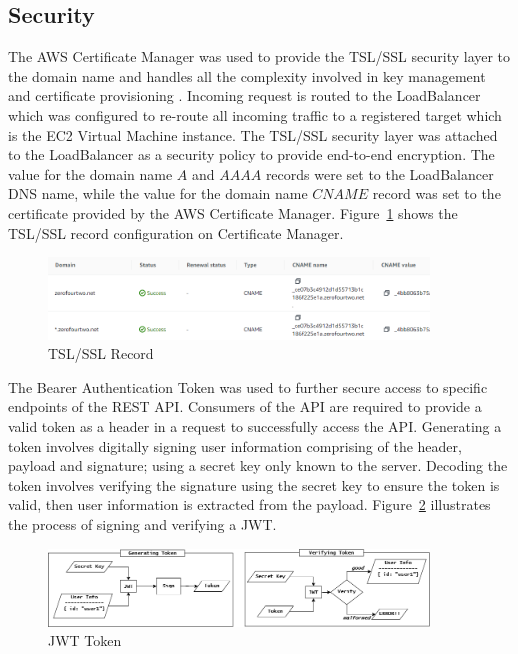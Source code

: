 \subsection{Security}
The AWS Certificate Manager was used to provide the TSL/SSL security layer to the domain name and handles all the complexity involved in 
key management and certificate provisioning \cite{aws_acm}. Incoming request is routed to the LoadBalancer which was configured to re-route all incoming traffic 
to a registered target which is the EC2 Virtual Machine instance. The TSL/SSL security layer was attached to the LoadBalancer as a security policy 
to provide end-to-end encryption. The value for the domain name $A$ and $AAAA$ records were set to the LoadBalancer DNS name, while the value 
for the domain name $CNAME$ record was set to the certificate provided by the AWS Certificate Manager. 
Figure~\ref{image:ssl_record} shows the TSL/SSL record configuration on Certificate Manager. 

\begin{figure}[h!]
    \begin{center}
        \includegraphics[width=0.9\textwidth]{images/ssl_record.png}
        \caption{TSL/SSL Record}
        \label{image:ssl_record}
    \end{center}
\end{figure}

The Bearer Authentication Token was used to further secure access to specific endpoints of the REST API. Consumers of the API are required to 
provide a valid token as a header in a request to successfully access the API. Generating a token involves digitally signing user information 
comprising of the header, payload and signature; using a secret key only known to the server. Decoding the token involves verifying the signature 
using the secret key to ensure the token is valid, then user information is extracted from the payload. Figure~\ref{image:jwt} illustrates the 
process of signing and verifying a JWT. 

\begin{figure}[h!]
    \begin{center}
        \includegraphics[width=0.9\textwidth]{images/jwt.png}
        \caption{JWT Token}
        \label{image:jwt}
    \end{center}
\end{figure}



